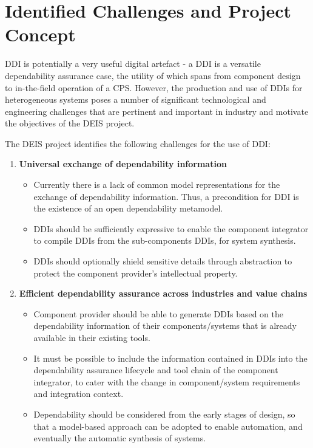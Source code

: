 \section{Identified Challenges and Project Concept}
DDI is potentially a very useful digital artefact - a DDI is a versatile dependability assurance case, the utility of which spans from component design to in-the-field operation of a CPS. However, the production and use of DDIs for heterogeneous systems poses a number of significant technological and engineering challenges that are pertinent and important in industry and motivate the objectives of the DEIS project. 

The DEIS project identifies the following challenges for the use of DDI:

\begin{enumerate}
	\item \textbf{Universal exchange of dependability information}
		\begin{itemize}
			\item Currently there is a lack of common model representations for the exchange of dependability information. Thus, a precondition for DDI is the existence of an open dependability metamodel. 
			\item DDIs should be sufficiently expressive to enable the component integrator to compile DDIs from the sub-components DDIs, for system synthesis.
			\item DDIs should optionally shield sensitive details through abstraction to protect the component provider's intellectual property. 
		\end{itemize}
	\item \textbf{Efficient dependability assurance across industries and value chains}
		\begin{itemize}
			\item Component provider should be able to generate DDIs based on the dependability information of their components/systems that is already available in their existing tools.
			\item It must be possible to include the information contained in DDIs into the dependability assurance lifecycle and tool chain of the component integrator, to cater with the change in component/system requirements and integration context.
			\item Dependability should be considered from the early stages of design, so that a model-based approach can be adopted to enable automation, and eventually the automatic synthesis of systems.
		\end{itemize}

\end{enumerate}
